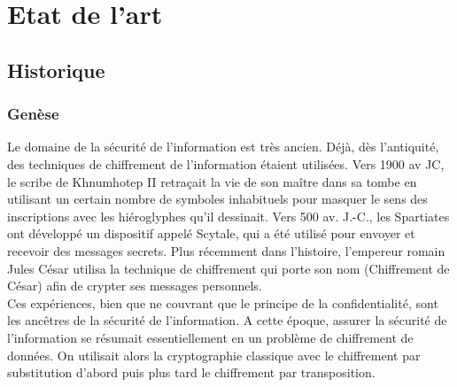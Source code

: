 \chapter{Etat de l'art}
\minitoc
\clearpage

\section{Historique}

\subsection{Genèse}
Le domaine de la sécurité de l'information est très ancien. Déjà, dès l’antiquité, des techniques de chiffrement de l’information étaient utilisées. Vers 1900 av JC, le scribe de Khnumhotep II retraçait la vie de son maître dans sa tombe en utilisant un certain nombre de symboles inhabituels pour masquer le sens des inscriptions avec les hiéroglyphes qu’il dessinait. Vers 500 av. J.-C., les Spartiates ont développé un dispositif appelé Scytale, qui a été utilisé pour envoyer et recevoir des messages secrets. Plus récemment dans l’histoire, l’empereur romain Jules César utilisa la technique de chiffrement qui porte son nom (Chiffrement de César) afin de crypter ses messages personnels. \cite{cours-crypto-mendy}\\
Ces expériences, bien que ne couvrant que le principe de la confidentialité, sont les ancêtres de la sécurité de l’information. A cette époque, assurer la sécurité de l’information se résumait essentiellement en un problème de chiffrement de données. On utilisait alors la cryptographie classique avec le chiffrement par substitution d’abord  puis plus tard le chiffrement par transposition.

